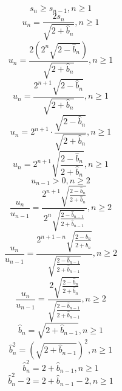 \documentclass[a4paper,12pt]{report}
\begin{document}
\begin{equation}
s_n \geq s_{n-1}, n \geq 1
\end{equation}
\begin{equation}
u_n = \frac{2s_n}{\sqrt{2 + \hat{b}_n}}, n \geq 1
\end{equation}
\begin{equation}
u_n = \frac{2 \left(2^n \sqrt{2 - \hat{b}_n}\right)}{\sqrt{2 + \hat{b}_n}}, n \geq 1
\end{equation}
\begin{equation}
u_n = \frac{2^{n+1} \sqrt{2 - \hat{b}_n}}{\sqrt{2 + \hat{b}_n}}, n \geq 1
\end{equation}
\begin{equation}
u_n = 2^{n+1} \cdot \frac{\sqrt{2 - \hat{b}_n}}{\sqrt{2 + \hat{b}_n}}, n \geq 1
\end{equation}
\begin{equation}
u_n = 2^{n+1} \sqrt{\frac{2 - \hat{b}_n}{2 + \hat{b}_n}}, n \geq 1
\end{equation}
\begin{equation}
u_{n-1} > 0, n \geq 2
\end{equation}
\begin{equation}
\frac{u_n}{u_{n-1}} = \frac{2^{n+1} \sqrt{\frac{2 - \hat{b}_n}{2 + \hat{b}_n}}}{2^n \sqrt{\frac{2 - \hat{b}_{n-1}}{2 + \hat{b}_{n-1}}}}, n \geq 2
\end{equation}
\begin{equation}
\frac{u_n}{u_{n-1}} = \frac{2^{n+1-n} \sqrt{\frac{2 - \hat{b}_n}{2 + \hat{b}_n}}}{\sqrt{\frac{2 - \hat{b}_{n-1}}{2 + \hat{b}_{n-1}}}}, n \geq 2
\end{equation}
\begin{equation}
\frac{u_n}{u_{n-1}} = \frac{2 \sqrt{\frac{2 - \hat{b}_n}{2 + \hat{b}_n}}}{\sqrt{\frac{2 - \hat{b}_{n-1}}{2 + \hat{b}_{n-1}}}}, n \geq 2
\end{equation}
\begin{equation}
\hat{b}_n = \sqrt{2 + \hat{b}_{n-1}}, n \geq 1
\end{equation}
\begin{equation}
\hat{b}_n^2 = \left(\sqrt{2 + \hat{b}_{n-1}}\right)^2, n \geq 1
\end{equation}
\begin{equation}
\hat{b}_n^2 = 2 + \hat{b}_{n-1}, n \geq 1
\end{equation}
\begin{equation}
\hat{b}_n^2 - 2 = 2 + \hat{b}_{n-1} - 2, n \geq 1
\end{equation}
\end{document}
